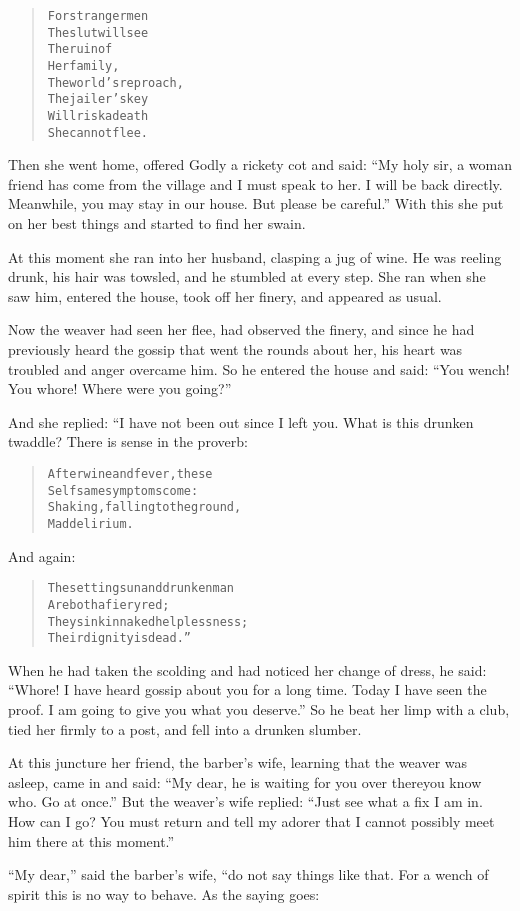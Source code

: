 \documentclass[article, twoside, 14pt]{memoir}
\renewenvironment{verbatim}{%
\begin{quote}%
\vskip -10pt%
\begin{alltt}\normalfont\large}{\end{alltt}%
\end{quote}%
\vskip -10pt
} %
\begin{document}
\begin{verbatim}
For stranger men
    The slut will see
The ruin of
    Her family,
The world's reproach,
    The jailer's key{\textemdash}
Will risk a death
    She cannot flee.
\end{verbatim}
Then she went home, offered Godly a rickety cot and said:
``My holy sir, a woman friend has come from the village and I must speak to her. I will be back directly. Meanwhile, you may stay in our house. But please be careful.''
With this she put on her best things and started to find her
swain.

At this moment she ran into her husband, clasping a jug of wine. He
was reeling drunk, his hair was towsled, and he stumbled at every
step. She ran when she saw him, entered the house, took off her
finery, and appeared as usual.

Now the weaver had seen her flee, had observed the finery, and
since he had previously heard the gossip that went the rounds
about her, his heart was troubled and anger overcame him. So he
entered the house and said:
``You wench! You whore! Where were you going?''

And she replied: “I have not been out since I left you. What is
this drunken twaddle? There is sense in the proverb:

\begin{verbatim}
After wine and fever, these
    Selfsame symptoms come:
Shaking, falling to the ground,
    Mad delirium.
\end{verbatim}
And again:

\begin{verbatim}
The setting sun and drunken man
    Are both a fiery red;
They sink in naked helplessness;
    Their dignity is dead.”
\end{verbatim}
When he had taken the scolding and had noticed her change of dress,
he said:
``Whore! I have heard gossip about you for a long time. Today I have seen the proof. I am going to give you what you deserve.''
So he beat her limp with a club, tied her firmly to a post, and
fell into a drunken slumber.

At this juncture her friend, the barber's wife, learning that the
weaver was asleep, came in and said:
``My dear, he is waiting for you over there{\textemdash}you know who. Go at once.''
But the weaver's wife replied:
``Just see what a fix I am in. How can I go? You must return and tell my adorer that I cannot possibly meet him there at this moment.''

``My dear,'' said the barber's wife, “do not say things like that.
For a wench of spirit this is no way to behave. As the saying
goes:
\end{document}
